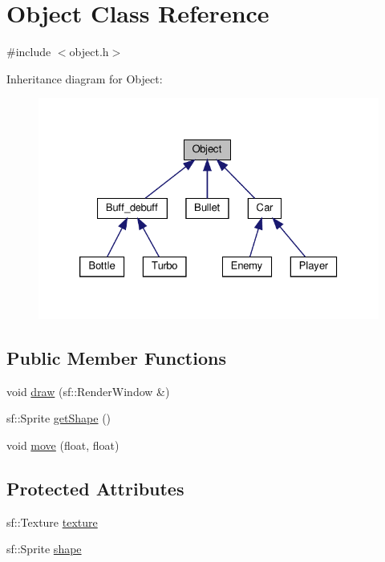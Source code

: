 \hypertarget{classObject}{}\section{Object Class Reference}
\label{classObject}


{\ttfamily \#include $<$object.\+h$>$}



Inheritance diagram for Object\+:\nopagebreak
\begin{figure}[H]
\begin{center}
\leavevmode
\includegraphics[width=326pt]{classObject__inherit__graph}
\end{center}
\end{figure}
\subsection*{Public Member Functions}
\begin{DoxyCompactItemize}
\item 
void \hyperlink{classObject_a9e90592420891436fef1a41c42498e8b}{draw} (sf\+::\+Render\+Window \&)
\item 
sf\+::\+Sprite \hyperlink{classObject_ae38e77de9a92daab0e6fea8d3ba56fdd}{get\+Shape} ()
\item 
void \hyperlink{classObject_a2cded255e6f55fb4542ca036450876f3}{move} (float, float)
\end{DoxyCompactItemize}
\subsection*{Protected Attributes}
\begin{DoxyCompactItemize}
\item 
sf\+::\+Texture \hyperlink{classObject_a8abc6192982ee39b2dc9d9b05cc155ee}{texture}
\item 
sf\+::\+Sprite \hyperlink{classObject_a563c6c058bb3549ef8bc8cbc01c4e7e1}{shape}
\end{DoxyCompactItemize}


